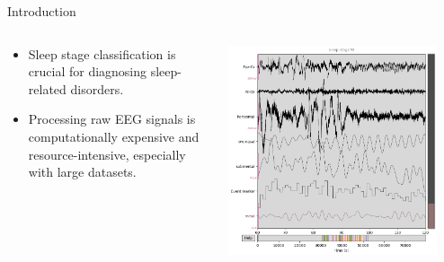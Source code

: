 \begin{frame}{Introduction }
	\begin{columns}[c]
		\begin{column}{0.48\textwidth}
			
			\begin{itemize}
				\item Sleep stage classification is crucial for diagnosing sleep-related disorders.
				\item Processing raw EEG signals is computationally expensive and resource-intensive, especially with large datasets.
			\end{itemize}
		\end{column}
		\begin{column}{0.48\textwidth}
			\centering
			\includegraphics[width=0.9\textwidth]{images/paper_2/Sleep signals.png}
		\end{column}
	\end{columns}
\end{frame}


